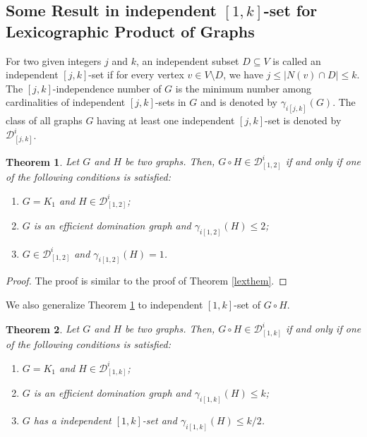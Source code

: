 \documentclass[A4,12pt]{article}
\newtheorem{theorem}{Theorem}[section]
\theoremstyle{definition}
\theoremstyle{remark}
\begin{document}
\subsection{Some Result in independent $[1,k]$-set for Lexicographic Product of Graphs}
For two given integers $j$ and $k$, an independent subset $D \subseteq V$ is called an independent $[j, k]$-set  if for every vertex $v \in V\setminus D$, we have $j \leq \vert N(v) \cap D \vert \leq k$. The $[j, k]$-independence number of $G$ is the minimum number among cardinalities of independent $[j, k]$-sets in $G$ and is denoted by $\gamma_{i[j,k]}(G)$. The class of all graphs $G$ having at least one independent $[j,k]$-set is denoted by  $\mathcal{D}_{[j,k]}^i$.

\begin{theorem} \label{lexthem2}
	Let  $G$ and $H$ be two graphs. Then, $G \circ H \in \mathcal{D}_{[1,2]}^i$  if and only if one of the following conditions is satisfied:
\begin{enumerate}
\item
$G=K_1$ and $H \in \mathcal{D}^i_{[1,2]}$;
  \item
  $G$ is an efficient domination graph and $\gamma_{i[1,2]}(H)\leq2$;
\item
  $G \in \mathcal{D}_{[1,2]}^i$ and $\gamma_{i[1,2]}(H)=1$.
\end{enumerate}

\end{theorem}
\begin{proof}
The proof is similar to the proof of Theorem \ref{lexthem}.
\end{proof}
We also generalize Theorem \ref{lexthem2} to  independent $[1,k]$-set of  $G \circ H$.


\begin{theorem}
	Let $G$ and $H$ be two graphs. Then, $G\circ H \in \mathcal{D}^i_{[1,k]}$ if and only if one of the following conditions is satisfied:
\begin{enumerate}
\item
$G=K_1$ and $H \in \mathcal{D}^i_{[1,k]}$;
  \item
  $G$ is an efficient domination graph  and $\gamma_{i[1,k]}(H)\leq k$;
  \item
   $G$ has a independent $[1,k]$-set  and $\gamma_{i[1,k]}(H)\leq k/2$.
   \end{enumerate}
   \end{theorem}
\end{document}

